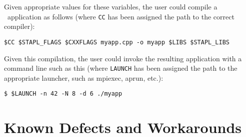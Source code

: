 \documentclass{report}
\begin{document}
Given appropriate values for these variables, 
the user could compile a \stapl\ application as follows
(where \texttt{CC} has been assigned the path to the correct compiler):

\begin{verbatim}
$CC $STAPL_FLAGS $CXXFLAGS myapp.cpp -o myapp $LIBS $STAPL_LIBS
\end{verbatim}

Given this compilation, the user could invoke the resulting
application with a command line such as this
(where \texttt{LAUNCH} has been assigned the path to the appropriate launcher, 
such as mpiexec, aprun, etc.):

\begin{verbatim}
$ $LAUNCH -n 42 -N 8 -d 6 ./myapp
\end{verbatim}


\chapter{Known Defects and Workarounds}
\end{document}
